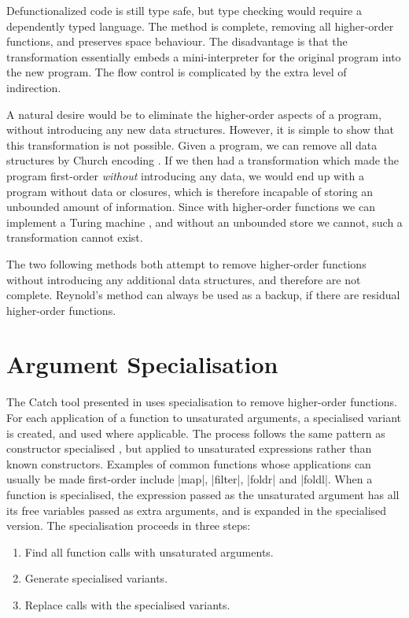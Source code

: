Defunctionalized code is still type safe, but type checking would require a dependently typed language. The method is complete, removing all higher-order functions, and preserves space behaviour. The disadvantage is that the transformation essentially embeds a mini-interpreter for the original program into the new program. The flow control is complicated by the extra level of indirection.

A natural desire would be to eliminate the higher-order aspects of a program, without introducing any new data structures. However, it is simple to show that this transformation is not possible. Given a program, we can remove all data structures by Church encoding \cite{church_encode}. If we then had a transformation which made the program first-order \textit{without} introducing any data, we would end up with a program without data or closures, which is therefore incapable of storing an unbounded amount of information. Since with higher-order functions we can implement a Turing machine \cite{turing:halting}, and without an unbounded store we cannot, such a transformation cannot exist.

The two following methods both attempt to remove higher-order functions without introducing any additional data structures, and therefore are not complete. Reynold's method can always be used as a backup, if there are residual higher-order functions.


\section{Argument Specialisation}

The Catch tool presented in \cite{me:catch_tfp} uses specialisation to remove higher-order functions. For each application of a function to unsaturated arguments, a specialised variant is created, and used where applicable. The process follows the same pattern as constructor specialised \cite{spj:specconstr}, but applied to unsaturated expressions rather than known constructors. Examples of common functions whose applications can usually be made first-order include |map|, |filter|, |foldr| and |foldl|. When a function is specialised, the expression passed as the unsaturated argument has all its free variables passed as extra arguments, and is expanded in the specialised version. The specialisation proceeds in three steps:

\begin{enumerate}
\item Find all function calls with unsaturated arguments.
\item Generate specialised variants.
\item Replace calls with the specialised variants.
\end{enumerate}

